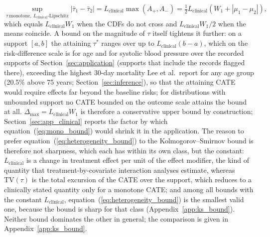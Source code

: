 \documentclass[AMA,Times1COL]{WileyNJDv5}
\begin{document}
\begin{equation}
\sup_{\tau\ \text{monotone},\ L_{\text{clinical}}\text{-Lipschitz}} |\bar{\tau}_1 - \bar{\tau}_2| = L_{\text{clinical}} \max(A_+, A_-) = \tfrac{1}{2} L_{\text{clinical}} \left( W_1 + |\mu_1 - \mu_2| \right),
\label{eq:mono_bound}
\end{equation}
which equals $L_{\text{clinical}} W_1$ when the CDFs do not cross and $L_{\text{clinical}} W_1 / 2$ when the means coincide. A bound on the magnitude of $\tau$ itself tightens it further: on a support $[a, b]$ the attaining $\tau^*$ ranges over up to $L_{\text{clinical}} (b - a)$, which on the risk-difference scale is  for age and  for systolic blood pressure over the recorded supports of Section~\ref{sec:application} (supports that include the records flagged there), exceeding the highest 30-day mortality Lee et al.\ report for any age group (20.5\% above 75 years; Section~\ref{sec:inference}), so that the attaining CATE would require effects far beyond the baseline risks; for distributions with unbounded support no CATE bounded on the outcome scale attains the bound at all. $\Delta_{\max} = L_{\text{clinical}} W_1$ is therefore a conservative upper bound by construction; Section~\ref{sec:app_clinical} reports the factor by which equation~(\ref{eq:mono_bound}) would shrink it in the application. The reason to prefer equation~(\ref{eq:heterogeneity_bound}) to the Kolmogorov--Smirnov bound is therefore not sharpness, which each has within its own class, but the constant: $L_{\text{clinical}}$ is a change in treatment effect per unit of the effect modifier, the kind of quantity that treatment-by-covariate interaction analyses estimate, whereas $\mathrm{TV}(\tau)$ is the total excursion of the CATE over the support, which reduces to a clinically stated quantity only for a monotone CATE; and among all bounds with the constant $L_{\text{clinical}}$, equation~(\ref{eq:heterogeneity_bound}) is the smallest valid one, because the bound is sharp for that class (Appendix~\ref{app:ks_bound}). Neither bound dominates the other in general; the comparison is given in Appendix~\ref{app:ks_bound}.
\end{document}
